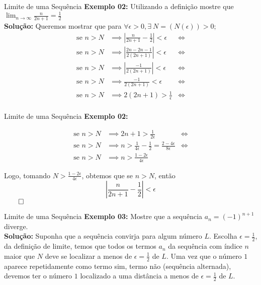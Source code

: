 \documentclass[hyperref={pdfpagelabels=false}]{beamer}
\begin{document}
\begin{frame}{Limite de uma Sequência}
 {\bf Exemplo 02:} Utilizando a definição mostre que $\displaystyle \lim_{n \to \infty} \frac{n}{2n + 1} = \frac{1}{2}$ \\ \pause
 {\bf Solução:} \pause Queremos mostrar que para $\forall \epsilon > 0, \exists ~N = (N(\epsilon))>0;$ \\ \pause
 \begin{align*}
  \text{se } n > N &\implies \left| \frac{n}{2n + 1} - \frac{1}{2} \right| < \epsilon &\iff \\
  \text{se } n > N &\implies \left| \frac{2n - 2n - 1}{2(2n+1)} \right| < \epsilon &\iff \\
  \text{se } n > N &\implies \left| \frac{-1}{2(2n+1)}\right| < \epsilon &\iff \\
  \text{se } n > N &\implies \frac{-1}{2(2n+1)} < \epsilon &\iff \\
  \text{se } n > N &\implies 2(2n + 1) > \frac{1}{\epsilon} &\iff \\
 \end{align*}

\end{frame}

\begin{frame}{Limite de uma Sequência}
 {\bf Exemplo 02:}
 
 \begin{align*}
  \text{se } n > N &\implies 2n + 1 > \frac{1}{2\epsilon} &\iff \\
  \text{se } n > N &\implies n > \frac{1}{4\epsilon} - \frac{1}{2} = \frac{2-4\epsilon}{8\epsilon} &\iff \\
  \text{se } n > N &\implies n > \frac{1-2\epsilon}{4\epsilon}
 \end{align*} \pause
 
 Logo, tomando $N > \displaystyle \frac{1 - 2 \epsilon}{4\epsilon}$, obtemos que se $n > N$, então $$\left|\frac{n}{2n+1} - \frac{1}{2}\right| < \epsilon$$ $\qed$

\end{frame}

\begin{frame}{Limite de uma Sequência}
 {\bf Exemplo 03:} Mostre que a sequência $a_n = (-1)^{n+1}$ diverge. \\ \pause
 {\bf Solução:} \pause Suponha que a sequência convirja para algum número $L$. Escolha $\epsilon = \displaystyle \frac{1}{2}$, da definição de limite, temos que todos os termos $a_n$ da sequência com índice $n$ maior que $N$ deve se localizar a menos de $\epsilon = \displaystyle \frac{1}{2}$ de $L$. \pause Uma vez que o número $1$ aparece repetidamente como termo sim, termo não (sequência alternada), devemos ter o número $1$ localizado a uma distância a menos de $\epsilon = \displaystyle \frac{1}{2}$ de $L$. 
  
\end{frame}
\end{document}
